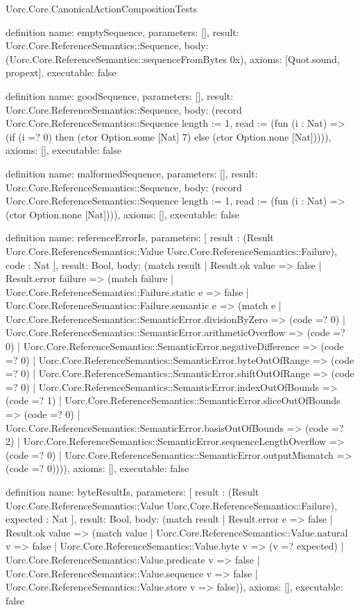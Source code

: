 \begin{lexlean}{Uorc.Core.CanonicalActionCompositionTests}
\begin{semanticmodule}
definition{
  name: emptySequence,
  parameters: [],
  result: Uorc.Core.ReferenceSemantics::Sequence,
  body: (Uorc.Core.ReferenceSemantics::sequenceFromBytes 0x),
  axioms: [Quot.sound, propext],
  executable: false
}

definition{
  name: goodSequence,
  parameters: [],
  result: Uorc.Core.ReferenceSemantics::Sequence,
  body: (record Uorc.Core.ReferenceSemantics::Sequence {length := 1, read := (fun (i : Nat) => (if (i =? 0) then (ctor Option.some [Nat] 7) else (ctor Option.none [Nat])))}),
  axioms: [],
  executable: false
}

definition{
  name: malformedSequence,
  parameters: [],
  result: Uorc.Core.ReferenceSemantics::Sequence,
  body: (record Uorc.Core.ReferenceSemantics::Sequence {length := 1, read := (fun (i : Nat) => (ctor Option.none [Nat]))}),
  axioms: [],
  executable: false
}

definition{
  name: referenceErrorIs,
  parameters: [
    result : (Result Uorc.Core.ReferenceSemantics::Value Uorc.Core.ReferenceSemantics::Failure),
    code : Nat
  ],
  result: Bool,
  body: (match result
    | Result.ok value => false
    | Result.error failure => (match failure
      | Uorc.Core.ReferenceSemantics::Failure.static e => false
      | Uorc.Core.ReferenceSemantics::Failure.semantic e => (match e
        | Uorc.Core.ReferenceSemantics::SemanticError.divisionByZero => (code =? 0)
        | Uorc.Core.ReferenceSemantics::SemanticError.arithmeticOverflow => (code =? 0)
        | Uorc.Core.ReferenceSemantics::SemanticError.negativeDifference => (code =? 0)
        | Uorc.Core.ReferenceSemantics::SemanticError.byteOutOfRange => (code =? 0)
        | Uorc.Core.ReferenceSemantics::SemanticError.shiftOutOfRange => (code =? 0)
        | Uorc.Core.ReferenceSemantics::SemanticError.indexOutOfBounds => (code =? 1)
        | Uorc.Core.ReferenceSemantics::SemanticError.sliceOutOfBounds => (code =? 0)
        | Uorc.Core.ReferenceSemantics::SemanticError.basisOutOfBounds => (code =? 2)
        | Uorc.Core.ReferenceSemantics::SemanticError.sequenceLengthOverflow => (code =? 0)
        | Uorc.Core.ReferenceSemantics::SemanticError.outputMismatch => (code =? 0)))),
  axioms: [],
  executable: false
}

definition{
  name: byteResultIs,
  parameters: [
    result : (Result Uorc.Core.ReferenceSemantics::Value Uorc.Core.ReferenceSemantics::Failure),
    expected : Nat
  ],
  result: Bool,
  body: (match result
    | Result.error e => false
    | Result.ok value => (match value
      | Uorc.Core.ReferenceSemantics::Value.natural v => false
      | Uorc.Core.ReferenceSemantics::Value.byte v => (v =? expected)
      | Uorc.Core.ReferenceSemantics::Value.predicate v => false
      | Uorc.Core.ReferenceSemantics::Value.sequence v => false
      | Uorc.Core.ReferenceSemantics::Value.store v => false)),
  axioms: [],
  executable: false
}


\end{semanticmodule}
\end{lexlean}
